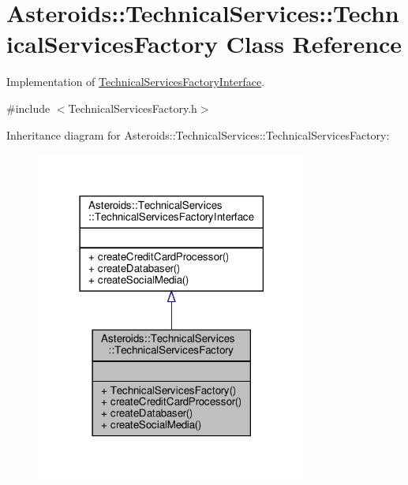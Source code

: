 \hypertarget{classAsteroids_1_1TechnicalServices_1_1TechnicalServicesFactory}{}\section{Asteroids\+:\+:Technical\+Services\+:\+:Technical\+Services\+Factory Class Reference}
\label{classAsteroids_1_1TechnicalServices_1_1TechnicalServicesFactory}


Implementation of \hyperlink{classAsteroids_1_1TechnicalServices_1_1TechnicalServicesFactoryInterface}{Technical\+Services\+Factory\+Interface}.  




{\ttfamily \#include $<$Technical\+Services\+Factory.\+h$>$}



Inheritance diagram for Asteroids\+:\+:Technical\+Services\+:\+:Technical\+Services\+Factory\+:\nopagebreak
\begin{figure}[H]
\begin{center}
\leavevmode
\includegraphics[width=254pt]{classAsteroids_1_1TechnicalServices_1_1TechnicalServicesFactory__inherit__graph}
\end{center}
\end{figure}


